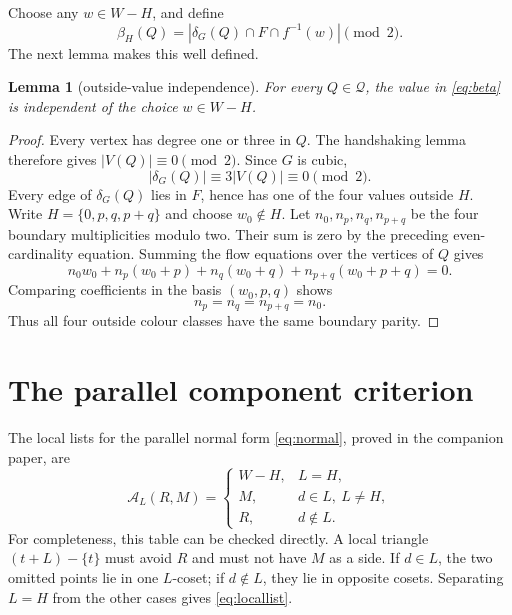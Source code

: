 \documentclass[11pt]{article}
\newtheorem{lemma}[theorem]{Lemma}
\theoremstyle{definition}
\theoremstyle{remark}
\newcommand{\A}{\mathcal A}
\newcommand{\Q}{\mathcal Q}
\numberwithin{equation}{section}
\begin{document}
Choose any \(w\in W-H\), and define
\begin{equation}
 \beta_H(Q)=
 \left|\delta_G(Q)\cap F\cap f^{-1}(w)\right|\pmod2.         \label{eq:beta}
\end{equation}
The next lemma makes this well defined.

\begin{lemma}[outside-value independence]\label{lem:beta}
For every \(Q\in\Q\), the value in \eqref{eq:beta} is independent of
the choice \(w\in W-H\).
\end{lemma}

\begin{proof}
Every vertex has degree one or three in \(Q\).  The handshaking lemma
therefore gives \(|V(Q)|\equiv0\pmod2\).  Since \(G\) is cubic,
\[
 |\delta_G(Q)|\equiv 3|V(Q)|\equiv0\pmod2.
\]
Every edge of \(\delta_G(Q)\) lies in \(F\), hence has one of the four
values outside \(H\).  Write \(H=\{0,p,q,p+q\}\) and choose
\(w_0\notin H\).  Let \(n_0,n_p,n_q,n_{p+q}\) be the four boundary
multiplicities modulo two.  Their sum is zero by the preceding
even-cardinality equation.  Summing the flow equations over the
vertices of \(Q\) gives
\[
 n_0w_0+n_p(w_0+p)+n_q(w_0+q)+n_{p+q}(w_0+p+q)=0.
\]
Comparing coefficients in the basis \((w_0,p,q)\) shows
\[
 n_p=n_q=n_{p+q}=n_0.
\]
Thus all four outside colour classes have the same boundary parity.
\end{proof}

\section{The parallel component criterion}

The local lists for the parallel normal form
\eqref{eq:normal}, proved in the companion paper, are
\begin{equation}
\A_L(R,M)=
\begin{cases}
W-H,&L=H,\\
M,&d\in L,\ L\ne H,\\
R,&d\notin L.
\end{cases}                                                  \label{eq:locallist}
\end{equation}
For completeness, this table can be checked directly.  A local
triangle \((t+L)-\{t\}\) must avoid \(R\) and must not have \(M\) as a
side.  If \(d\in L\), the two omitted points lie in one \(L\)-coset; if
\(d\notin L\), they lie in opposite cosets.  Separating \(L=H\) from
the other cases gives \eqref{eq:locallist}.
\end{document}
